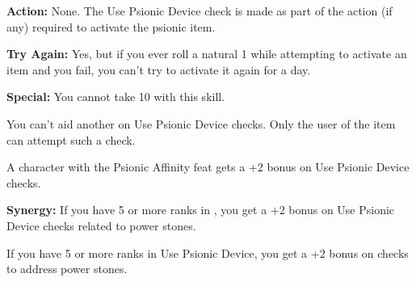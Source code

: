\textbf{Action:} None. The Use Psionic Device check is made as part of the action (if any) required to activate the psionic item.

\textbf{Try Again:} Yes, but if you ever roll a natural 1 while attempting to activate an item and you fail, you can't try to activate it again for a day.

\textbf{Special:} You cannot take 10 with this skill.

You can't aid another on Use Psionic Device checks. Only the user of the item can attempt such a check.

A character with the Psionic Affinity feat gets a +2 bonus on Use Psionic Device checks.

\textbf{Synergy:} If you have 5 or more ranks in , you get a +2 bonus on Use Psionic Device checks related to power stones.

If you have 5 or more ranks in Use Psionic Device, you get a +2 bonus on  checks to address power stones.